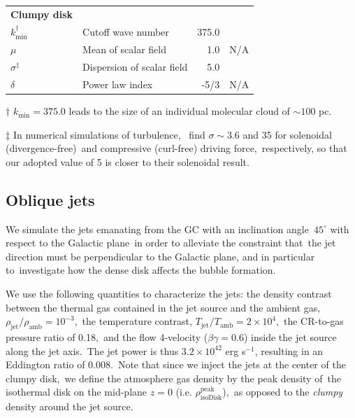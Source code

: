 \documentclass[fleqn,usenatbib,useAMS]{mnras}
\begin{document}
\begin{table}
\begin{tabular}{@{}llrc@{}}
{\bf Clumpy disk }                    &                                &                                      &                                \\
$k_{\text{min}}^\dagger$              & Cutoff wave number             & 375.0                                & \citep{peak-ism-density}       \\
$\mu$                                 & Mean of scalar field           & 1.0                                  &   N/A                          \\
$\sigma^\ddag$                        & Dispersion of scalar field     & 5.0                                  & \citep{Federrath2010}          \\
$\delta$                              & Power law index                & -5/3                                 &   N/A                          \\ \midrule
\end{tabular}
\begin{tablenotes}
      \raggedright
      \item  $\dagger$  $k_{\text{min}}=375.0$ leads to the size of an individual molecular cloud of $\sim 100$ pc.
      \item  $\ddag$ In numerical simulations of turbulence,\
             \citet{Federrath2010} find $\sigma\sim 3.6$ and 35 for solenoidal (divergence-free)\
             and compressive (curl-free) driving force,\
             respectively, so that our adopted value of 5 is closer to their solenoidal result.
    \end{tablenotes}
\end{table}

%

\subsection{Oblique jets}

  We simulate the jets emanating from the GC with an inclination angle\
  $45^{\circ}$ with respect to the Galactic plane\
  in order to alleviate the constraint that\
  the jet direction must be perpendicular to the Galactic plane, and in particular to\
  investigate how the dense disk affects the bubble formation.


  We use the following quantities to characterize the jets:
  the density contrast between the thermal gas contained in the jet source and the ambient gas,\
  $\rho_{\text{jet}}/\rho_{\text{amb}}=10^{-3}$,\
  the temperature contrast, $T_{\text{jet}}/T_{\text{amb}}=2\times10^{4}$,\
  the CR-to-gas pressure ratio of 0.18,\
  and the flow 4-velocity ($\beta\gamma = 0.6$) inside the jet source along the jet axis.\
  The jet power is thus $3.2\times 10^{42}$ erg s$^{-1}$, resulting in an Eddington ratio of 0.008.\
  Note that since we inject the jets at the center of the clumpy disk,\
  we define the atmosphere gas density by the peak density of\
  the isothermal disk on the mid-plane $z=0$ (i.e. $\rho^{\text{peak}}_{\text{isoDisk}}$),\
  as opposed to the \textit{clumpy} density around the jet source.
\end{document}
